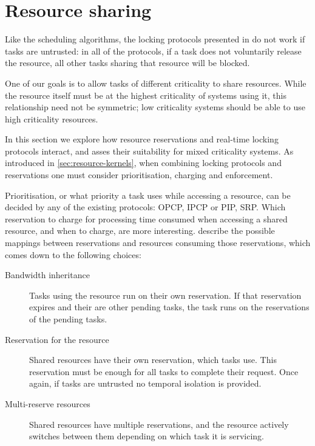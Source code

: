 \section{Resource sharing}

Like the scheduling algorithms, the locking protocols presented in
 do not work if tasks are untrusted: in all of the protocols, if a
task does not voluntarily release the resource, all other tasks sharing that resource will be
blocked.

One of our goals is to allow tasks of different criticality to share resources.  While the resource
itself must be at the highest criticality of systems using it, this relationship need not be
symmetric; low criticality systems should be able to use high criticality resources.

In this section we explore how resource reservations and real-time locking protocols interact, and
asses their suitability for mixed criticality systems.  As introduced in
\cref{sec:resource-kernels}, when combining locking protocols and reservations one must consider
prioritisation, charging and enforcement.

Prioritisation, or what priority a task uses while accessing a resource, can be decided by any of
the existing protocols: \gls{OPCP}, \gls{IPCP} or \gls{PIP}, \gls{SRP}. Which reservation to charge 
for processing time consumed when accessing a shared resource, and when to charge, are more
interesting. \citet{deNiz_LSR_01} describe the possible mappings
between reservations and resources consuming those reservations, which comes down to the following
choices:

\begin{description}
\item[Bandwidth inheritance] Tasks using the resource run on their own reservation.  If that
    reservation expires and their are other pending tasks, the task runs on the reservations of the
    pending tasks. 
\item[Reservation for the resource] Shared resources have their own reservation, which tasks use.
    This reservation must be enough for all tasks to complete their request.  Once again, if tasks
    are untrusted no temporal isolation is provided. 
\item[Multi-reserve resources] Shared resources have multiple reservations, and the resource
    actively switches between them depending on which task it is servicing. 
\end{description} 

